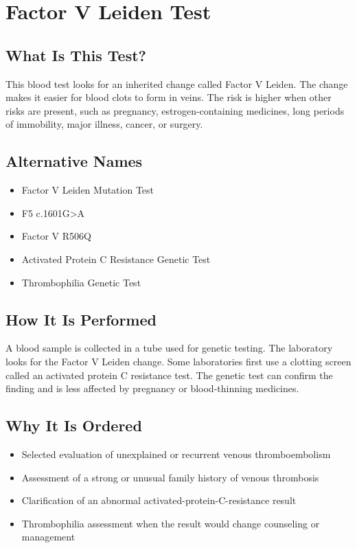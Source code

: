 \chapter{Factor V Leiden Test}

\section*{What Is This Test?}
This blood test looks for an inherited change called Factor V Leiden. The change makes it easier for blood clots to form in veins. The risk is higher when other risks are present, such as pregnancy, estrogen-containing medicines, long periods of immobility, major illness, cancer, or surgery.

\section*{Alternative Names}
\begin{itemize}
  \item Factor V Leiden Mutation Test
  \item F5 c.1601G>A
  \item Factor V R506Q
  \item Activated Protein C Resistance Genetic Test
  \item Thrombophilia Genetic Test
\end{itemize}
\section*{How It Is Performed}
A blood sample is collected in a tube used for genetic testing. The laboratory looks for the Factor V Leiden change. Some laboratories first use a clotting screen called an activated protein C resistance test. The genetic test can confirm the finding and is less affected by pregnancy or blood-thinning medicines.

\section*{Why It Is Ordered}
\begin{itemize}
  \item Selected evaluation of unexplained or recurrent venous thromboembolism
  \item Assessment of a strong or unusual family history of venous thrombosis
  \item Clarification of an abnormal activated-protein-C-resistance result
  \item Thrombophilia assessment when the result would change counseling or management
\end{itemize}

